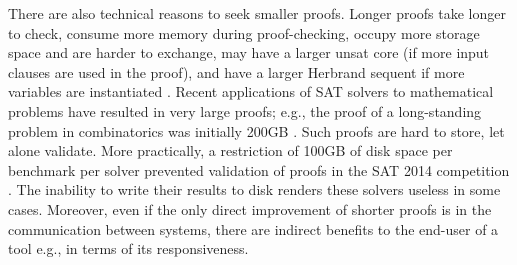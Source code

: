There are also technical reasons to seek smaller proofs.
Longer proofs take longer to check, consume more memory during proof-checking, occupy more storage space and are harder to exchange, may have a larger unsat core (if more input clauses are used in the proof), and have a larger Herbrand sequent if more variables are instantiated \cite{B10,B16,ResolutionHerbrand,Reis}. Recent applications of SAT solvers to mathematical problems have resulted in very large proofs; e.g., the proof of a long-standing problem in combinatorics was initially 200GB \cite{heule2016solving}. Such proofs are hard to store, let alone validate. More practically, a restriction of 100GB of disk space per benchmark per solver prevented validation of proofs in the SAT 2014 competition \cite{clausal}. 
The inability to write their results to disk renders these solvers useless in some cases. Moreover, even if the only direct improvement of shorter proofs is in the communication between systems, there are indirect benefits to the end-user of a tool e.g., in terms of its responsiveness. 




